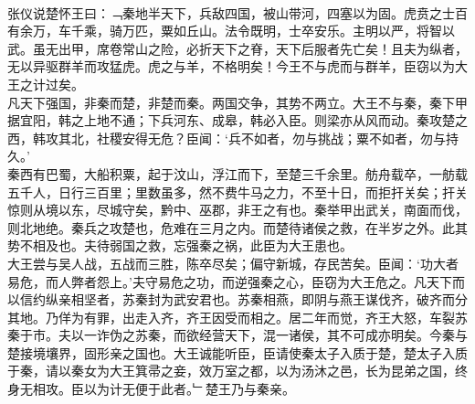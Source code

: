 {\\
张仪说楚怀王曰：﹁秦地半天下，兵敌四国，被山带河，四塞以为固。虎贲之士百有余万，车千乘，骑万匹，粟如丘山。法令既明，士卒安乐。主明以严，将智以武。虽无出甲，席卷常山之险，必折天下之脊，天下后服者先亡矣！且夫为纵者，无以异驱群羊而攻猛虎。虎之与羊，不格明矣！今王不与虎而与群羊，臣窃以为大王之计过矣。\\
凡天下强国，非秦而楚，非楚而秦。两国交争，其势不两立。大王不与秦，秦下甲据宜阳，韩之上地不通；下兵河东、成皋，韩必入臣。则梁亦从风而动。秦攻楚之西，韩攻其北，社稷安得无危？臣闻：‘兵不如者，勿与挑战；粟不如者，勿与持久。’\\
秦西有巴蜀，大船积粟，起于汶山，浮江而下，至楚三千余里。舫舟载卒，一舫载五千人，日行三百里；里数虽多，然不费牛马之力，不至十日，而拒扞关矣；扞关惊则从境以东，尽城守矣，黔中、巫郡，非王之有也。秦举甲出武关，南面而伐，则北地绝。秦兵之攻楚也，危难在三月之内。而楚待诸侯之救，在半岁之外。此其势不相及也。夫待弱国之救，忘强秦之祸，此臣为大王患也。\\
大王尝与吴人战，五战而三胜，陈卒尽矣；偏守新城，存民苦矣。臣闻：‘功大者易危，而人弊者怨上。’夫守易危之功，而逆强秦之心，臣窃为大王危之。凡天下而以信约纵亲相坚者，苏秦封为武安君也。苏秦相燕，即阴与燕王谋伐齐，破齐而分其地。乃佯为有罪，出走入齐，齐王因受而相之。居二年而觉，齐王大怒，车裂苏秦于市。夫以一诈伪之苏秦，而欲经营天下，混一诸侯，其不可成亦明矣。今秦与楚接境壤界，固形亲之国也。大王诚能听臣，臣请使秦太子入质于楚，楚太子入质于秦，请以秦女为大王箕帚之妾，效万室之都，以为汤沐之邑，长为昆弟之国，终身无相攻。臣以为计无便于此者。﹂楚王乃与秦亲。
}
